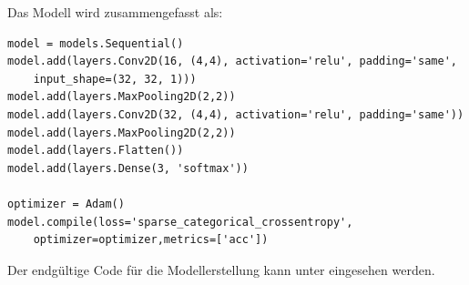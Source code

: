 Das Modell wird zusammengefasst als:

\begin{lstlisting}
model = models.Sequential()
model.add(layers.Conv2D(16, (4,4), activation='relu', padding='same',
    input_shape=(32, 32, 1)))
model.add(layers.MaxPooling2D(2,2))
model.add(layers.Conv2D(32, (4,4), activation='relu', padding='same'))
model.add(layers.MaxPooling2D(2,2))
model.add(layers.Flatten())
model.add(layers.Dense(3, 'softmax'))

optimizer = Adam()
model.compile(loss='sparse_categorical_crossentropy',
    optimizer=optimizer,metrics=['acc'])
\end{lstlisting}

Der endgültige Code für die Modellerstellung kann unter  eingesehen werden.
